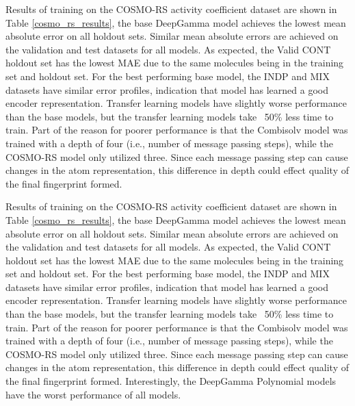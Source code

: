 Results of training on the COSMO-RS activity coefficient dataset are shown in Table \ref{cosmo_rs_results}, the base DeepGamma model achieves the lowest mean absolute error on all holdout sets. Similar mean absolute errors are achieved on the validation and test datasets for all models. As expected, the Valid CONT holdout set has the lowest MAE due to the same molecules being in the training set and holdout set.  For the best performing base model, the INDP and MIX datasets have similar error profiles, indication that model has learned a good encoder representation.  Transfer learning models have slightly worse performance than the base models, but the transfer learning models take ~50\% less time to train. Part of the reason for poorer performance is that the Combisolv model was trained with a depth of four (i.e., number of message passing steps), while the COSMO-RS model only utilized three. Since each message passing step can cause changes in the atom representation, this difference in depth could effect quality of the final fingerprint formed. 


Results of training on the COSMO-RS activity coefficient dataset are shown in Table \ref{cosmo_rs_results}, the base DeepGamma model achieves the lowest mean absolute error on all holdout sets. Similar mean absolute errors are achieved on the validation and test datasets for all models. As expected, the Valid CONT holdout set has the lowest MAE due to the same molecules being in the training set and holdout set.  For the best performing base model, the INDP and MIX datasets have similar error profiles, indication that model has learned a good encoder representation.  Transfer learning models have slightly worse performance than the base models, but the transfer learning models take ~50\% less time to train. Part of the reason for poorer performance is that the Combisolv model was trained with a depth of four (i.e., number of message passing steps), while the COSMO-RS model only utilized three. Since each message passing step can cause changes in the atom representation, this difference in depth could effect quality of the final fingerprint formed. Interestingly, the DeepGamma Polynomial models have the worst performance of all models.

